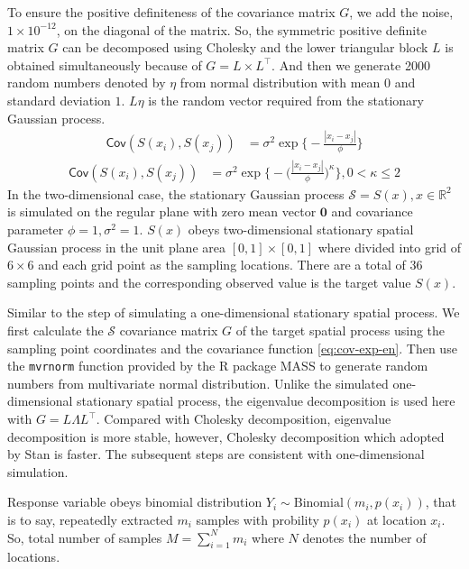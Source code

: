 \documentclass[12pt,a4paper,UTF8,twoside]{book}
\begin{document}
To ensure the positive definiteness of the covariance matrix \(G\), we
add the noise, \(1 \times 10^{-12}\), on the diagonal of the matrix. So,
the symmetric positive definite matrix \(G\) can be decomposed using
Cholesky and the lower triangular block \(L\) is obtained simultaneously
because of \(G = L \times L^{\top}\). And then we generate 2000 random
numbers denoted by \(\eta\) from normal distribution with mean \(0\) and
standard deviation \(1\). \(L\eta\) is the random vector required from
the stationary Gaussian process. \begin{align}
\mathsf{Cov}(S(x_i), S(x_j)) & = \sigma^2 \exp\big\{ - \frac{|x_{i} - x_{j}|}{ \phi } \big\}  \label{eq:cov-exp-en}
\end{align} \begin{align}
\mathsf{Cov}(S(x_i), S(x_j)) & = \sigma^2 \exp\big\{ -\big( \frac{ |x_{i} - x_{j}| }{ \phi } \big) ^ {\kappa} \big\}, 0 < \kappa \leq 2  \label{eq:cov-exp-quad-en} 
\end{align} In the two-dimensional case, the stationary Gaussian process
\(\mathcal{S} = S(x), x \in \mathbb{R}^2\) is simulated on the regular
plane with zero mean vector \(\mathbf{0}\) and covariance parameter
\(\phi = 1, \sigma^2 = 1\). \(S(x)\) obeys two-dimensional stationary
spatial Gaussian process in the unit plane area \([0,1] \times [0,1]\)
where divided into grid of \(6 \times 6\) and each grid point as the
sampling locations. There are a total of 36 sampling points and the
corresponding observed value is the target value \(S(x)\).

Similar to the step of simulating a one-dimensional stationary spatial
process. We first calculate the \(\mathcal{S}\) covariance matrix \(G\)
of the target spatial process using the sampling point coordinates and
the covariance function \eqref{eq:cov-exp-en}. Then use the
\texttt{mvrnorm} function provided by the R package MASS to generate
random numbers from multivariate normal distribution. Unlike the
simulated one-dimensional stationary spatial process, the eigenvalue
decomposition is used here with \(G = L\Lambda L^{\top}\). Compared with
Cholesky decomposition, eigenvalue decomposition is more stable,
however, Cholesky decomposition which adopted by Stan is faster. The
subsequent steps are consistent with one-dimensional simulation.

Response variable obeys binomial distribution
\(Y_{i} \sim \mathrm{Binomial}(m_{i},p(x_{i}))\), that is to say,
repeatedly extracted \(m_i\) samples with probility \(p(x_i)\) at
location \(x_i\). So, total number of samples \(M = \sum_{i=1}^{N}m_i\)
where \(N\) denotes the number of locations.
\end{document}
